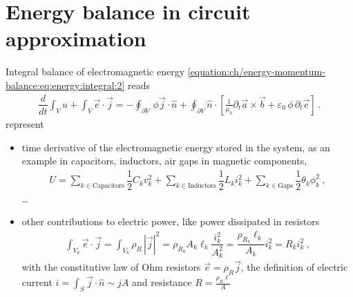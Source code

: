 \documentclass[letterpaper,10pt,english]{jupyterBook}
\begin{document}
\chapter{Energy balance in circuit approximation}
\label{\detokenize{ch/circuits-energy:energy-balance-in-circuit-approximation}}\label{\detokenize{ch/circuits-energy:classical-electromagnetism-circuits-energy}}\label{\detokenize{ch/circuits-energy::doc}}
\sphinxAtStartPar
Integral balance of electromagnetic energy \eqref{equation:ch/energy-momentum-balance:eq:energy:integral:2} reads
\begin{equation*}
\begin{split}\dfrac{d}{dt} \int_V u + \int_{V} \vec{e} \cdot \vec{j} = - \oint_{\partial V} \, \phi \vec{j} \cdot \hat{n} + \oint_{\partial V} \hat{n} \cdot \left[ \frac{1}{\mu_0} \partial_t \vec{a} \times \vec{b} + \varepsilon_0 \, \phi\, \partial_t \vec{e} \right] \ .\end{split}
\end{equation*}
\sphinxAtStartPar
{} represent
\begin{itemize}
\item {} 
\sphinxAtStartPar
time derivative of the electromagnetic energy stored in the system, as an example in capacitors, inductors, air gaps in magnetic components,
\begin{equation*}
\begin{split}U = \sum_{k \in \text{Capacitors}} \dfrac{1}{2} C_k v_k^2 + \sum_{k \in \text{Inductors}} \dfrac{1}{2} L_k i_k^2 + \sum_{k \in \text{Gaps}} \dfrac{1}{2} \theta_k \phi_k^2 \ ,\end{split}
\end{equation*}
\sphinxAtStartPar
…

\item {} 
\sphinxAtStartPar
other contributions to electric power, like power dissipated in resistors
\begin{equation*}
\begin{split}\int_{V_k} \vec{e} \cdot \vec{j} = \int_{V_k} \rho_R \, |\vec{j}|^2 = \rho_{R_k} A_k \ell_k \dfrac{i_k^2}{A_k^2} = \dfrac{\rho_{R_k} \ell_k}{A_k} i_k^2 = R_k i_k^2 \ , \end{split}
\end{equation*}
\sphinxAtStartPar
with the constitutive law of Ohm resistors \(\vec{e} = \rho_R \vec{j}\), the definition of electric current \(i = \int_S \vec{j} \cdot \hat{n} \sim j A\) and resistance \(R = \frac{\rho_R \ell}{A}\)

\end{itemize}
\end{document}
